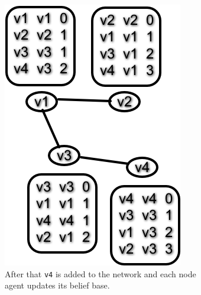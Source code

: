 \begin{figure}
  \centering
    \ContinuedFloat %
    \begin{subfigure}{.45\textwidth}
        \includegraphics[width=\textwidth] {images/dv4.png}
       \caption{After that \texttt{v4} is added to the network and each node agent updates its belief base.}
    \end{subfigure}\quad
    \begin{subfigure}{.45\textwidth}

\end{subfigure}
\end{figure}
